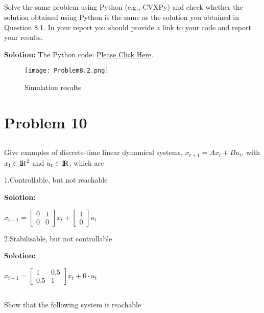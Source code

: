 \documentclass[a4paper,11pt,reqno]{amsart}
\newcommand{\R}{{\rm I\!R}}
\begin{document}
\subsection{}

Solve the same problem using Python (e.g., CVXPy) and check whether the solution obtained
using Python is the same as the solution you obtained in Question 8.1. In your report you should
provide a link to your code and report your results.

\textbf{Solotion:}
The Python code: \href{https://github.com/Chanawesome/ELE8088-EXTRA/blob/main/Problem8.2.py}{Please Click Here}.
\begin{figure}[H]
    \centering
    \texttt{[image: Problem8.2.png]}
    \caption{Simulation results}
    \label{f9}
\end{figure}

\section{Problem 10}
\subsection{}
Give examples of discrete-time linear dynamical systems, $x_{t+1} = Ax_t + Bu_t$, with $x_t \in \R^2$ and
$u_t \in \R$, which are

1.Controllable, but not reachable

\textbf{Solotion:}

$x_{t+1}=\begin{bmatrix} 0 & 1 \\ 0 & 0 \end{bmatrix}x_t+\begin{bmatrix} 1 \\ 0 \end{bmatrix}u_t$

2.Stabilisable, but not controllable

\textbf{Solotion:}

$x_{t+1}=\begin{bmatrix} 1 & 0.5 \\ 0.5 & 1 \end{bmatrix}x_t+0\cdot u_t$

\subsection{}
Show that the following system is reachable
\end{document}
